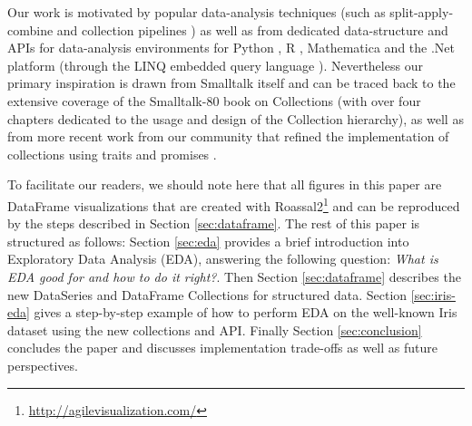\documentclass[sigplan]{acmart}
\begin{document}
Our work is motivated by popular data-analysis techniques (such as split-apply-combine \cite{wickham2011split} and collection pipelines \cite{Fowler15}) as well as from dedicated data-structure and APIs for data-analysis environments for Python \cite{McKinney}, R \cite{team2000r}, Mathematica \cite{wolfram1999mathematica} and the .Net platform (through the LINQ embedded query language \cite{meijer2006linq}). Nevertheless our primary inspiration is drawn from Smalltalk itself and can be traced back to the extensive coverage of the Smalltalk-80 book on Collections \cite{Goldberg} (with over four chapters dedicated to the usage and design of the Collection hierarchy), as well as from more recent work from our community that refined the implementation of collections using traits \cite{black2003applying, bourgois2010bloc, scharli2003traits} and promises \cite{Alcocer16}.

To facilitate our readers, we should note here that all figures in this paper are DataFrame visualizations that are created with Roassal2\cite{Bergel}\footnote{\url{http://agilevisualization.com/}} and can be reproduced by the steps described in Section \ref{sec:dataframe}.
The rest of this paper is structured as follows: Section \ref{sec:eda} provides a brief introduction into Exploratory Data Analysis (EDA), answering the following question: \textit{What is EDA good for and how to do it right?}. Then Section \ref{sec:dataframe} describes the new DataSeries and DataFrame Collections for structured data. Section \ref{sec:iris-eda} gives a step-by-step example of how to perform EDA on the well-known Iris dataset using the new collections and API.
Finally Section \ref{sec:conclusion} concludes the paper and discusses implementation trade-offs as well as future perspectives.



%
%
%
%
\end{document}
